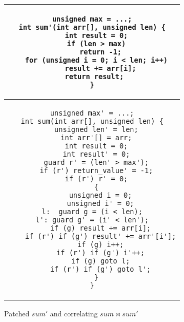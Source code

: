 \begin{figure}
\centering
\begin{tabular}{c}
\begin{lstlisting}
unsigned max = ...;
int sum'(int arr[], unsigned len) {
  int result = 0;
  if (len > max)
    return -1;
  for (unsigned i = 0; i < len; i++)
    result += arr[i];
 return result;
}
\end{lstlisting}
\\ \hline
\begin{lstlisting}
unsigned max' = ...;
int sum(int arr[], unsigned len) {
  unsigned len' = len;
  int arr'[] = arr;
  int result = 0;
  int result' = 0;
  guard r' = (len' > max');
  if (r') return_value' = -1;
  if (r') r' = 0;
  {
    unsigned i = 0;
    unsigned i' = 0;
l:  guard g = (i < len);
l': guard g' = (i' < len');
    if (g) result += arr[i];
    if (r') if (g') result' += arr'[i'];
    if (g) i++;
    if (r') if (g') i'++;
    if (g) goto l;
    if (r') if (g') goto l';
  }
}
\end{lstlisting}
\end{tabular}
\caption{Patched $sum'$ and correlating $sum \bowtie sum'$}
\end{figure} 
